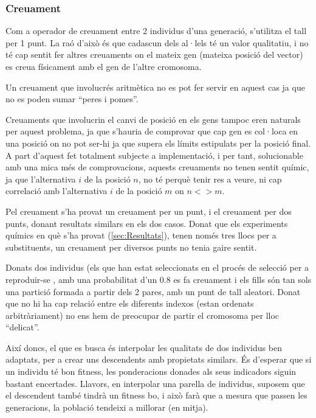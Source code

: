 \subsubsection{Creuament} %
\label{ssub:Crossover}

Com a operador de creuament entre 2 individus d'una generació, s'utilitza el
tall per 1 punt.  La raó d'això és que cadascun dels al·lels té un valor
qualitatiu, i no té cap sentit fer altres creuaments on el mateix gen (mateixa
posició del vector) es creua físicament amb el gen de l'altre cromosoma.

Un creuament que involucrés aritmètica no es pot fer servir en aquest cas ja que
no es poden sumar ``peres i pomes''.

Creuaments que involucrin el canvi de posició en els gens tampoc eren naturals
per aquest problema, ja que s'hauria de comprovar que cap gen es col·loca en una
posició on no pot ser-hi ja que supera els límits estipulats per la
posició final.  A part d'aquest fet totalment subjecte a implementació, i per
tant, solucionable amb una mica més de comprovacions, aquests creuaments no
tenen sentit químic, ja que l'alternativa $i$ de la posició $n$, no té perquè
tenir res a veure, ni cap correlació amb l'alternativa $i$ de la posició $m$ on
$n <> m$.

Pel creuament s'ha provat un creuament per un punt, i el creuament per dos
punts, donant resultats similars en els dos casos.  Donat que els experiments
químics en què s'ha provat (\ref{sec:Resultats}), tenen només tres llocs per a
substituents, un creuament per diversos punts no tenia gaire sentit.

Donats dos individus (els que han estat seleccionats en el procés de
selecció per a reproduir-se , amb una probabilitat d'un 0.8 es fa creuament i
els fills són tan sols una partició formada a partir dels 2 pares, amb un punt
de tall aleatori.  Donat que no hi ha cap relació entre els diferents indexos
(estan ordenats arbitràriament) no ens hem de preocupar de partir el cromosoma
per lloc ``delicat''. 

Així doncs, el que es busca és interpolar les qualitats de dos individus ben
adaptats, per a crear uns descendents amb propietats similars.  És d'esperar que
si un individu té bon fitness, les ponderacions donades als seus indicadors
siguin bastant encertades.  Llavors, en interpolar una parella de individus,
suposem que el descendent també tindrà un fitness bo, i això farà que a mesura
que passen les generacions, la població tendeixi a millorar (en mitja).

